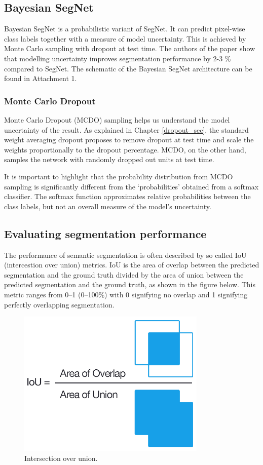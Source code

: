 \subsection{Bayesian SegNet}

Bayesian SegNet is a probabilistic variant of SegNet. It can predict pixel-wise class labels together with a measure of model uncertainty.  This is achieved by Monte Carlo sampling with dropout at test time. The authors of the paper show that modelling uncertainty improves segmentation performance by 2-3 \% compared to SegNet. The schematic of the Bayesian SegNet architecture can be found in Attachment 1. \cite{bayesian}

\subsubsection{Monte Carlo Dropout}

Monte Carlo Dropout (MCDO) sampling helps us understand the model uncertainty of the result. As explained in Chapter \ref{dropout_sec}, the standard weight averaging dropout proposes to remove dropout at test time and scale the weights proportionally to the dropout percentage. MCDO, on the other hand, samples the network with randomly dropped out units at test time. \cite{bayesian}

It is important to highlight that the probability distribution from MCDO sampling is significantly different from the ‘probabilities’ obtained from a softmax classifier. The softmax function approximates relative probabilities between the class labels, but not an overall measure of the model’s uncertainty. \cite{bayesian}

\subsection{Evaluating segmentation performance}

The performance of semantic segmentation is often described by so called IoU (intercestion over union) metrics. IoU is the area of overlap between the predicted segmentation and the ground truth divided by the area of union between the predicted segmentation and the ground truth, as shown in the figure below. This metric ranges from 0–1 (0–100\%) with 0 signifying no overlap and 1 signifying perfectly overlapping segmentation. \cite{iou}

\vspace{4mm}
\begin{figure}[h]
	\begin{center}
		\includegraphics*[width=9cm, keepaspectratio]{obr/iou.png}
	\end{center}
	\vspace{4mm}
	\caption{Intersection over union. \cite{iou}} 
	\label{iou}
\end{figure}




